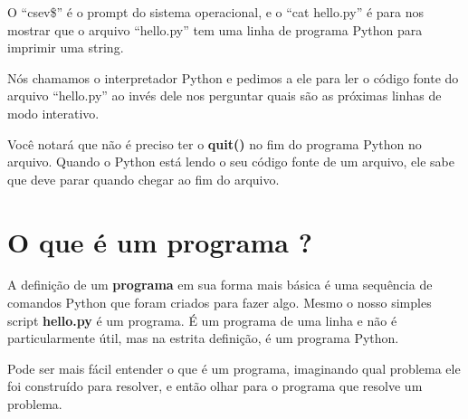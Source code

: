 
O ``csev\$'' é o prompt do sistema operacional, e o ``cat hello.py'' é
para nos mostrar que o arquivo ``hello.py'' tem uma linha de programa Python para
imprimir uma string.
%

Nós chamamos o interpretador Python e pedimos a ele para ler o código fonte do
arquivo ``hello.py'' ao invés dele nos perguntar quais são as próximas linhas
de modo interativo.
%

Você notará que não é preciso ter o {\bf quit()} no fim do programa Python
no arquivo. Quando o Python está lendo o seu código fonte de um arquivo,
ele sabe que deve parar quando chegar ao fim do arquivo.  
%

\section{O que é um programa ?}
%

A definição de um {\bf programa} em sua forma mais básica é uma sequência
de comandos Python que foram criados para fazer algo.
Mesmo o nosso simples script {\bf hello.py} é um programa. É um programa
de uma linha e não é particularmente útil, mas na estrita definição, é
um programa Python.
%

Pode ser mais fácil entender o que é um programa, imaginando qual problema ele
foi construído para resolver, e então olhar para o programa que resolve um
problema.
%

